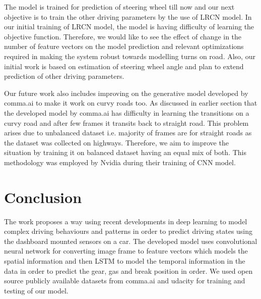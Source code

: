 \documentclass[a4paper,11pt,titlepage,drop]{article}%
\begin{document}
The model is trained for prediction of steering wheel till now and our next objective is to train the other driving parameters by the use of LRCN model. In our initial training of LRCN model, the model is having difficulty of learning the objective function. Therefore, we would like to see the effect of change in the number of feature vectors on the model prediction and relevant optimizations required in making the system robust towards modelling turns on road. Also, our initial work is based on estimation of steering wheel angle and plan to extend prediction of other driving parameters.

Our future work also includes improving on the generative model developed by comma.ai to make it work on curvy roads too. As discussed in earlier section that the developed model by comma.ai has difficulty in learning the transitions on a curvy road and after few frames it transits back to straight road. This problem arises due to unbalanced dataset i.e. majority of frames are for straight roads as the dataset was collected on highways. Therefore, we aim to improve the situation by training it on balanced dataset having an equal mix of both. This methodology was employed by Nvidia during their training of CNN model.


\section{Conclusion}

The work proposes a way using recent developments in deep learning to model complex driving behaviours and patterns in order to predict driving states using the dashboard mounted sensors on a car. The developed model uses convolutional neural network for converting image frame to feature vectors which models the spatial information and then LSTM to model the temporal information in the data in order to predict the gear, gas and break position in order. We used  open source publicly available datasets from comma.ai and udacity for training and testing of our model.


\small
\singlespacing


\end{document}
